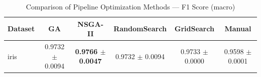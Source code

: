 \begin{table}[htbp]
\centering
\caption{Comparison of Pipeline Optimization Methods — F1 Score (macro)}
\label{tab:comparison}
\begin{tabular}{lccccc}
\toprule
Dataset & GA & NSGA-II & RandomSearch & GridSearch & Manual \\
\midrule
iris & 0.9732 $\pm$ 0.0094 & \textbf{0.9766 $\pm$ 0.0047} & 0.9732 $\pm$ 0.0094 & 0.9733 $\pm$ 0.0000 & 0.9598 $\pm$ 0.0001 \\
\bottomrule
\end{tabular}
\end{table}